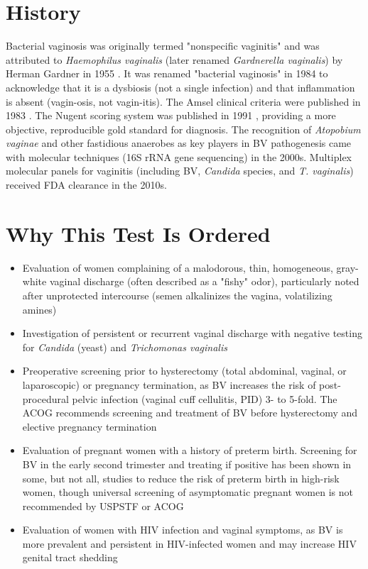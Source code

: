 \section*{History}
Bacterial vaginosis was originally termed "nonspecific vaginitis" and was attributed to \textit{Haemophilus vaginalis} (later renamed \textit{Gardnerella vaginalis}) by Herman Gardner in 1955 \cite{gardner1955haemophilus}. It was renamed "bacterial vaginosis" in 1984 to acknowledge that it is a dysbiosis (not a single infection) and that inflammation is absent (vagin-osis, not vagin-itis). The Amsel clinical criteria were published in 1983 \cite{amsel1983nonspecific}. The Nugent scoring system was published in 1991 \cite{nugent1991reliability}, providing a more objective, reproducible gold standard for diagnosis. The recognition of \textit{Atopobium vaginae} and other fastidious anaerobes as key players in BV pathogenesis came with molecular techniques (16S rRNA gene sequencing) in the 2000s. Multiplex molecular panels for vaginitis (including BV, \textit{Candida} species, and \textit{T. vaginalis}) received FDA clearance in the 2010s.

\section*{Why This Test Is Ordered}
\begin{itemize}
  \item Evaluation of women complaining of a malodorous, thin, homogeneous, gray-white vaginal discharge (often described as a "fishy" odor), particularly noted after unprotected intercourse (semen alkalinizes the vagina, volatilizing amines)
  \item Investigation of persistent or recurrent vaginal discharge with negative testing for \textit{Candida} (yeast) and \textit{Trichomonas vaginalis}
  \item Preoperative screening prior to hysterectomy (total abdominal, vaginal, or laparoscopic) or pregnancy termination, as BV increases the risk of post-procedural pelvic infection (vaginal cuff cellulitis, PID) 3- to 5-fold. The ACOG recommends screening and treatment of BV before hysterectomy and elective pregnancy termination
  \item Evaluation of pregnant women with a history of preterm birth. Screening for BV in the early second trimester and treating if positive has been shown in some, but not all, studies to reduce the risk of preterm birth in high-risk women, though universal screening of asymptomatic pregnant women is not recommended by USPSTF or ACOG
  \item Evaluation of women with HIV infection and vaginal symptoms, as BV is more prevalent and persistent in HIV-infected women and may increase HIV genital tract shedding
\end{itemize}

